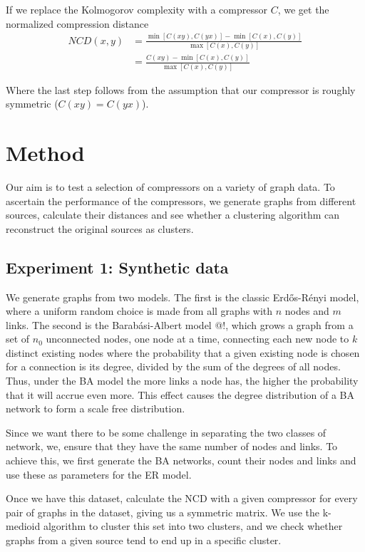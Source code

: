 \documentclass[10pt,a4paper,oneside]{article}
\begin{document}
If we replace the Kolmogorov complexity with a compressor $C$, we get the normalized compression distance
\begin{align*}
NCD(x, y) 
	&= \frac{\min \left [C(xy), C(yx)\right ] - \min \left[C(x), C(y)\right]}{\max \left [C(x), C(y) \right ]}\\
	&= \frac{C(xy) - \min \left[C(x), C(y)\right]}{\max \left [C(x), C(y) \right ]} 
\end{align*}
 
Where the last step follows from the assumption that our compressor is roughly symmetric ($C(xy) = C(yx)$).

\section*{Method}

Our aim is to test a selection of compressors on a variety of graph data. To ascertain the performance of the compressors, we generate graphs from different sources, calculate their distances and see whether a clustering algorithm can reconstruct the original sources as clusters. 

\subsection*{Experiment 1: Synthetic data}

We generate graphs from two models. The first is the classic Erd\H{o}s-R\'enyi model, where a uniform random choice is made from all graphs with $n$ nodes and $m$ links. The second is the Barab\'asi-Albert model \cite{}@!, which grows a graph from a set of $n_0$ unconnected nodes, one node at a time, connecting each new node to $k$ distinct existing nodes where the probability that a given existing node is chosen for a connection is its degree, divided by the sum of the degrees of all nodes. Thus, under the BA model the more links a node has, the higher the probability that it will accrue even more. This effect causes the degree distribution of a BA network to form a scale free distribution.

Since we want there to be some challenge in separating the two classes of network, we, ensure that they have the same number of nodes and links. To achieve this, we first generate the BA networks, count their nodes and links and use these as parameters for the ER model. 

Once we have this dataset, calculate the NCD with a given compressor for every pair of graphs in the dataset, giving us a symmetric matrix. We use the k-medioid algorithm to cluster this set into two clusters, and we check whether graphs from a given source tend to end up in a specific cluster. 
\end{document}
